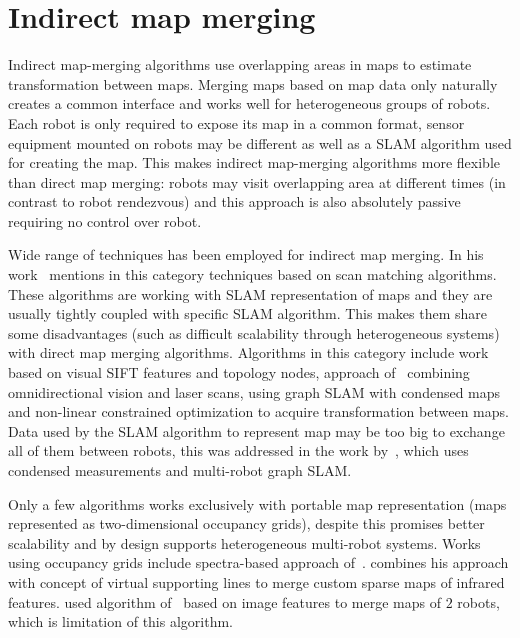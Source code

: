 \section{Indirect map merging}
\label{sec:indirect-map-merging}

Indirect map-merging algorithms use overlapping areas in maps to estimate transformation between maps. Merging maps based on map data only naturally creates a common interface and works well for heterogeneous groups of robots. Each robot is only required to expose its map in a common format, sensor equipment mounted on robots may be different as well as a \gls{SLAM} algorithm used for creating the map. This makes indirect map-merging algorithms more flexible than direct map merging: robots may visit overlapping area at different times (in contrast to robot rendezvous) and this approach is also absolutely passive requiring no control over robot.

Wide range of techniques has been employed for indirect map merging. In his work~\cite{Lee2012} mentions in this category techniques based on scan matching algorithms. These algorithms are working with \gls{SLAM} representation of maps and they are usually tightly coupled with specific \gls{SLAM} algorithm. This makes them share some disadvantages (such as difficult scalability through heterogeneous systems) with direct map merging algorithms. Algorithms in this category include \cite{Wang2012} work based on visual \gls{SIFT} features and topology nodes, approach of~\cite{Tungandi2010} combining omnidirectional vision and laser scans, \cite{Cunningham2012} using graph \gls{SLAM} with condensed maps and non-linear constrained optimization to acquire transformation between maps. Data used by the \gls{SLAM} algorithm to represent map may be too big to exchange all of them between robots, this was addressed in the work by~\cite{Lazaro2013}, which uses condensed measurements and multi-robot graph \gls{SLAM}.

Only a few algorithms works exclusively with portable map representation (maps represented as two-dimensional occupancy grids), despite this promises better scalability and by design supports heterogeneous multi-robot systems. Works using occupancy grids include spectra-based approach of~\cite{Carpin2008}. \cite{Lee2011} combines his approach with concept of virtual supporting lines to merge custom sparse maps of infrared features. \cite{martins2013mrslam} used algorithm of~\cite{MapstitchROS} based on image features to merge maps of $2$ robots, which is limitation of this algorithm.

